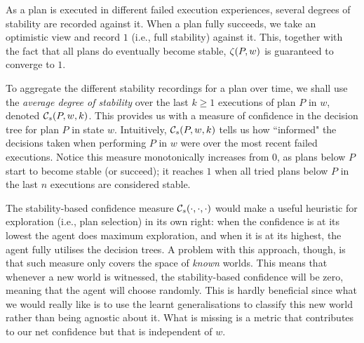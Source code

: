 As a plan is executed in different failed execution experiences, several degrees of stability are recorded against it. When a plan fully succeeds, we take an optimistic view and record $1$ (i.e., full stability) against it. This, together with the fact that all plans do eventually become stable, $\zeta(P,w)$ is guaranteed to converge to $1$. 


To aggregate the different stability recordings for a plan over time, we shall use the \emph{average degree of stability} over the last $k \geq 1$ executions of plan $P$ in $w$, denoted ${\mathcal{C}}_s(P,w,k)$. 
This provides us with a measure of confidence in the decision tree for plan $P$ in state $w$. Intuitively, ${\mathcal{C}}_s(P,w,k)$ tells us how ``informed" the decisions taken when performing $P$ in $w$ were over the most recent failed executions.
Notice this measure monotonically increases from $0$, as plans below $P$ start to become stable (or succeed); it reaches $1$ when all tried plans below $P$ in the last $n$ executions are considered stable. 


% 
% 
% 
% 
% 


The stability-based confidence measure ${\mathcal{C}}_s(\cdot,\cdot,\cdot)$ would make a useful heuristic for exploration (i.e., plan selection) in its own right: when the confidence is at its lowest the agent does maximum exploration, and when it is at its highest, the agent fully utilises the decision trees. 
A problem with this approach, though, is that such measure only covers the space of \emph{known} worlds. This means that whenever a new world is witnessed, the stability-based confidence will be zero, meaning that the agent will choose randomly. This is hardly beneficial since what we would really like is to use the learnt generalisations to classify this new world rather than being agnostic about it. 
What is missing is a metric that contributes to our net confidence but that is independent of $w$.


